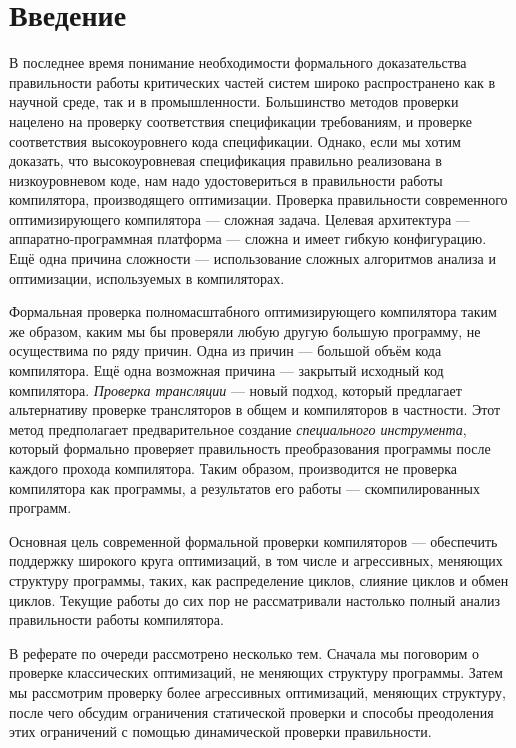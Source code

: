\section*{Введение}
%

В последнее время понимание необходимости формального доказательства правильности работы критических частей систем широко распространено как в научной среде, так и в промышленности. Большинство методов проверки нацелено на проверку соответствия спецификации требованиям, и проверке соответствия высокоуровнего кода спецификации. Однако, если мы хотим доказать, что высокоуровневая спецификация правильно реализована в низкоуровневом коде, нам надо удостовериться в правильности работы компилятора, производящего оптимизации. Проверка правильности современного оптимизирующего компилятора --- сложная задача. Целевая архитектура --- аппаратно-программная платформа --- сложна и имеет гибкую конфигурацию. Ещё одна причина сложности --- использование сложных алгоритмов анализа и оптимизации, используемых в компиляторах.

Формальная проверка полномасштабного оптимизирующего компилятора таким же образом, каким мы бы проверяли любую другую большую программу, не осуществима по ряду причин. Одна из причин --- большой объём кода компилятора. Ещё одна возможная причина --- закрытый исходный код компилятора. \emph{Проверка трансляции} --- новый подход, который предлагает альтернативу проверке трансляторов в общем и компиляторов в частности. Этот метод предполагает предварительное создание \emph{специального инструмента}, который формально проверяет правильность преобразования программы после каждого прохода компилятора. Таким образом, производится не проверка компилятора как программы, а результатов его работы --- скомпилированных программ.

Основная цель современной формальной проверки компиляторов --- обеспечить поддержку широкого круга оптимизаций, в том числе и агрессивных, меняющих структуру программы, таких, как распределение циклов, слияние циклов и обмен циклов. Текущие работы \cite{PSS98a,Nec00,RM00,ZPFG02} до сих пор не рассматривали настолько полный анализ правильности работы компилятора.

В реферате по очереди рассмотрено несколько тем. Сначала мы поговорим о проверке классических оптимизаций, не меняющих структуру программы. Затем мы рассмотрим проверку более агрессивных оптимизаций, меняющих структуру, после чего обсудим ограничения статической проверки и способы преодоления этих ограничений с помощью динамической проверки правильности.